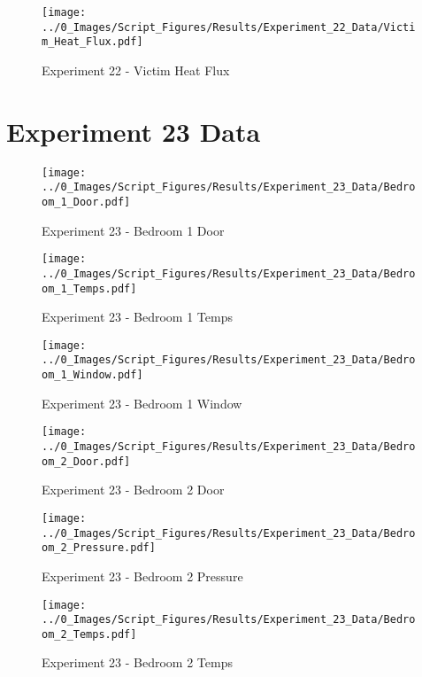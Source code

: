 	\begin{figure}[H]
		\centering
		\texttt{[image: ../0\_Images/Script\_Figures/Results/Experiment\_22\_Data/Victim\_Heat\_Flux.pdf]}
		\caption[]{Experiment 22 - Victim Heat Flux}
	\end{figure}
 
	\clearpage

\clearpage		\large
\section{Experiment 23 Data} \label{App:Exp23Results} 

	\begin{figure}[H]
		\centering
		\texttt{[image: ../0\_Images/Script\_Figures/Results/Experiment\_23\_Data/Bedroom\_1\_Door.pdf]}
		\caption[]{Experiment 23 - Bedroom 1 Door}
	\end{figure}
 

	\begin{figure}[H]
		\centering
		\texttt{[image: ../0\_Images/Script\_Figures/Results/Experiment\_23\_Data/Bedroom\_1\_Temps.pdf]}
		\caption[]{Experiment 23 - Bedroom 1 Temps}
	\end{figure}
 
	\clearpage

	\begin{figure}[H]
		\centering
		\texttt{[image: ../0\_Images/Script\_Figures/Results/Experiment\_23\_Data/Bedroom\_1\_Window.pdf]}
		\caption[]{Experiment 23 - Bedroom 1 Window}
	\end{figure}
 

	\begin{figure}[H]
		\centering
		\texttt{[image: ../0\_Images/Script\_Figures/Results/Experiment\_23\_Data/Bedroom\_2\_Door.pdf]}
		\caption[]{Experiment 23 - Bedroom 2 Door}
	\end{figure}
 
	\clearpage

	\begin{figure}[H]
		\centering
		\texttt{[image: ../0\_Images/Script\_Figures/Results/Experiment\_23\_Data/Bedroom\_2\_Pressure.pdf]}
		\caption[]{Experiment 23 - Bedroom 2 Pressure}
	\end{figure}
 

	\begin{figure}[H]
		\centering
		\texttt{[image: ../0\_Images/Script\_Figures/Results/Experiment\_23\_Data/Bedroom\_2\_Temps.pdf]}
		\caption[]{Experiment 23 - Bedroom 2 Temps}
	\end{figure}
 
